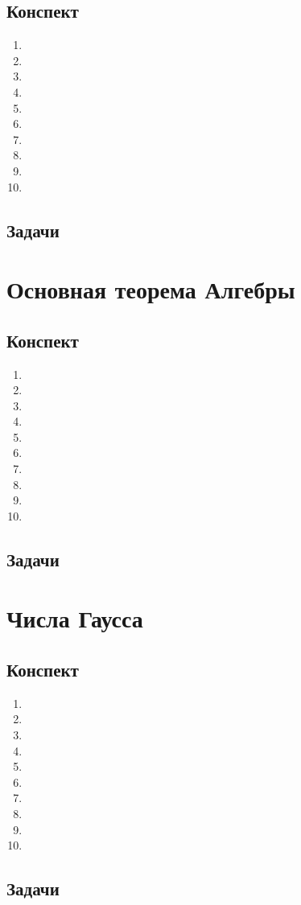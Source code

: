 \subsection{Конспект}
\begin{enumerate}\setlength{\itemsep}{1pt}
\item 
\item 
\item 
\item 
\item 
\item 
\item 
\item 
\item 
\item 
\end{enumerate}
\subsection{Задачи}



\section{Основная теорема Алгебры}

\subsection{Конспект}
\begin{enumerate}\setlength{\itemsep}{1pt}
\item 
\item 
\item 
\item 
\item 
\item 
\item 
\item 
\item 
\item 
\end{enumerate}
\subsection{Задачи}



\section{Числа Гаусса}

\subsection{Конспект}
\begin{enumerate}\setlength{\itemsep}{1pt}
\item 
\item 
\item 
\item 
\item 
\item 
\item 
\item 
\item 
\item 
\end{enumerate}
\subsection{Задачи}




